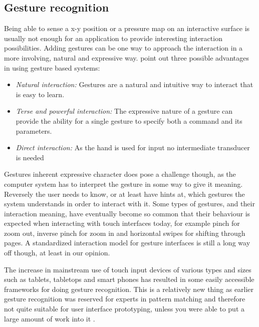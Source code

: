\subsection{Gesture recognition}
\label{ch:textiletouch:gesture_recognition}
Being able to sense a x-y position or a pressure map on an interactive surface is usually not enough for an application to provide interesting interaction possibilities.
Adding gestures can be one way to approach the interaction in a more involving, natural and expressive way.
\citet{baudel1993charade} point out three possible advantages in using gesture based systems:
\begin{itemize}
  \item \emph{Natural interaction:} Gestures are a natural and intuitive way to interact that is easy to learn.
  \item \emph{Terse and powerful interaction:} The expressive nature of a gesture can provide the ability for a single gesture to specify both a command and its parameters.
  \item \emph{Direct interaction:} As the hand is used for input no intermediate transducer is needed
\end{itemize}
Gestures inherent expressive character does pose a challenge though, as the computer system has to interpret the gesture in some way to give it meaning.
Reversely the user needs to know, or at least have hints at, which gestures the system understands in order to interact with it.
Some types of gestures, and their interaction meaning, have eventually become so common that their behaviour is expected when interacting with touch interfaces today, for example pinch for zoom out, inverse pinch for zoom in and horizontal swipes for shifting through pages.
A standardized interaction model for gesture interfaces is still a long way off though, at least in our opinion. 

The increase in mainstream use of touch input devices of various types and sizes such as tablets, tabletops and smart phones has resulted in some easily accessible frameworks for doing gesture recognition.
This is a relatively new thing as earlier gesture recognition was reserved for experts in pattern matching and therefore not quite suitable for user interface prototyping, unless you were able to put a large amount of work into it \citep{wobbrock2007gestures}.  

